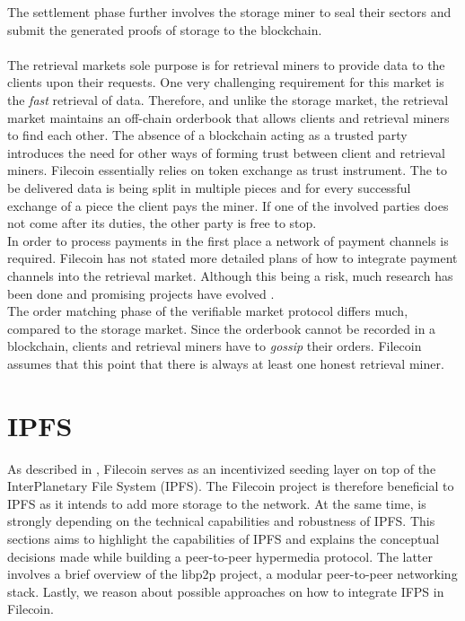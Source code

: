 \documentclass[conference]{IEEEtran}
\begin{document}
The settlement phase further involves the storage miner to seal their sectors and submit the generated proofs of storage to the blockchain.\cite{filecoin}
\\
\\
The retrieval markets sole purpose is for retrieval miners to provide data to the clients upon their requests.
One very challenging requirement for this market is the \textit{fast} retrieval of data.
Therefore, and unlike the storage market, the retrieval market maintains an off-chain orderbook that allows clients and retrieval miners to find each other.
The absence of a blockchain acting as a trusted party introduces the need for other ways of forming trust between client and retrieval miners.
Filecoin essentially relies on token exchange as trust instrument.
The to be delivered data is being split in multiple pieces and for every successful exchange of a piece the client pays the miner.
If one of the involved parties does not come after its duties, the other party is free to stop.
\\
\indent In order to process payments in the first place a network of payment channels is required.
Filecoin has not stated more detailed plans of how to integrate payment channels into the retrieval market. 
Although this being a risk, much research has been done and promising projects have evolved \cite{lightning}.
\\
\indent The order matching phase of the verifiable market protocol differs much, compared to the storage market.
Since the orderbook cannot be recorded in a blockchain, clients and retrieval miners have to \textit{gossip} their orders.
Filecoin assumes that this point that there is always at least one honest retrieval miner.
\cite{filecoin}

\section{IPFS}
As described in \cite{filecoin}, Filecoin serves as an incentivized seeding layer on top of the InterPlanetary File System (IPFS)\cite{ipfs-whitepaper}.
The Filecoin project is therefore beneficial to IPFS as it intends to add more storage to the network. At the same time, is strongly depending on the technical capabilities and robustness of IPFS.
This sections aims to highlight the capabilities of IPFS and explains the conceptual decisions made while building a peer-to-peer hypermedia protocol.
The latter involves a brief overview of the libp2p project\cite{libp2p}, a modular peer-to-peer networking stack.
Lastly, we reason about possible approaches on how to integrate IFPS in Filecoin.
\end{document}
